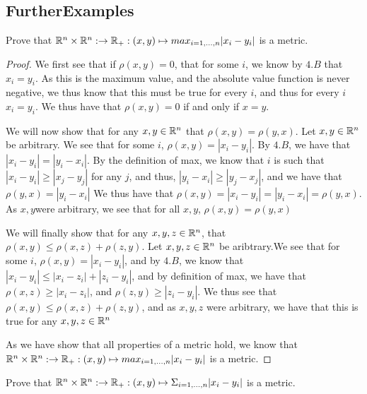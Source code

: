 \subsection{FurtherExamples}

\begin{minorEx}%
  Prove that $\mathbb{R}^n \times \mathbb{R}^n : \rightarrow \mathbb{R}_+: (x,y) \mapsto
  max_{i=1,...,n} |x_i-y_i|$ is a metric.
\end{minorEx}

\begin{proof}
  We first see that if $\rho(x,y)=0$, that for some $i$, we know by
  $4.B$ that $x_i = y_i$. As this is the maximum value, and the absolute
  value function is never negative, we thus know that this must be
  true for every $i$, and thus for every $i$ $x_i = y_i$. We thus have
  that $\rho(x,y)=0$ if and only if $x=y$.

  We will now show that for any $x,y\in \mathbb{R}^n$ that 
  $\rho(x,y) = \rho(y,x)$. Let $x,y \in \mathbb{R}^n$ be arbitrary. We see
  that for some $i$, $\rho(x,y) = |x_i-y_i|$. By $4.B$, we have that 
  $|x_i-y_i| = |y_i-x_i|$. By the definition of max, we know that $i$
  is such that $|x_i-y_i| \geq |x_j-y_j|$ for any $j$, and thus, 
 $|y_i-x_i|\geq |y_j-x_j|$, and we have that $\rho(y,x)=|y_i-x_i|$
 We thus have that $\rho(x,y)=|x_i-y_i| = |y_i-x_i|=\rho(y,x)$. As
 $x,y$were arbitrary, we see that for all $x,y$, $\rho(x,y) =
 \rho(y,x)$

 We will finally show that for any $x,y,z\in \mathbb{R}^n$, that
 $\rho(x,y)\leq \rho(x,z)+ \rho(z,y)$. Let $x,y,z \in \mathbb{R}^n$ be aribtrary.We see that for some $i$, 
 $\rho(x,y) = |x_i-y_i|$, and by $4.B$, we know that $ |x_i-y_i| \leq
 |x_i-z_i| +|z_i-y_i|$, and by definition of max, we have that
 $\rho(x,z)\geq |x_i-z_i|$, and  $\rho(z,y)\geq |z_i-y_i|$. We thus
 see that $\rho(x,y)\leq \rho(x,z)+ \rho(z,y)$, and as $x,y,z$ were
 arbitrary, we have that this is true for any $x,y,z\in \mathbb{R}^n$

 As we have show that all properties of a metric hold, we know that 
 $\mathbb{R}^n \times \mathbb{R}^n : \rightarrow \mathbb{R}_+: (x,y) \mapsto
  max_{i=1,...,n} |x_i-y_i|$ is a metric.
\end{proof}

\begin{minorEx}%
  Prove that $\mathbb{R}^n \times \mathbb{R}^n :\rightarrow \mathbb{R}_+: (x,y) \mapsto
  \Sigma_{i=1,...,n} |x_i- y_i|$ is a metric.
\end{minorEx}


